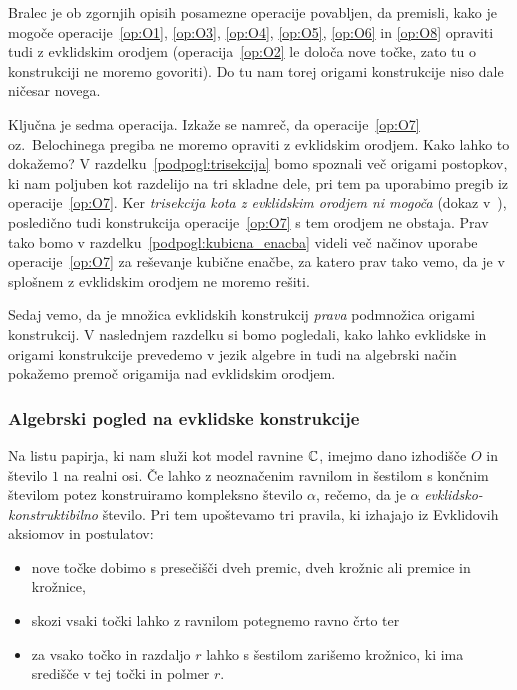 Bralec je ob zgornjih opisih posamezne operacije povabljen, da premisli, kako je mogoče operacije~\ref{op:O1}, \ref{op:O3}, \ref{op:O4}, \ref{op:O5}, \ref{op:O6} in \ref{op:O8} opraviti tudi z evklidskim orodjem (operacija~\ref{op:O2} le določa nove točke, zato tu o konstrukciji ne moremo govoriti). Do tu nam torej origami konstrukcije niso dale ničesar novega.

Ključna je sedma operacija. Izkaže se namreč, da operacije~\ref{op:O7} oz.\ Belochinega pregiba ne moremo opraviti z evklidskim orodjem. Kako lahko to dokažemo? V razdelku~\ref{podpogl:trisekcija} bomo spoznali več origami postopkov, ki nam poljuben kot razdelijo na tri skladne dele, pri tem pa uporabimo pregib iz operacije~\ref{op:O7}. Ker \emph{trisekcija kota z evklidskim orodjem ni mogoča} (dokaz v~\cite[str.\ 77--78]{jerman1998}), posledično tudi konstrukcija operacije~\ref{op:O7} s tem orodjem ne obstaja. Prav tako bomo v razdelku~\ref{podpogl:kubicna_enacba} videli več načinov uporabe operacije~\ref{op:O7} za reševanje kubične enačbe, za katero prav tako vemo, da je v splošnem z evklidskim orodjem ne moremo rešiti.

Sedaj vemo, da je množica evklidskih konstrukcij \emph{prava} podmnožica origami konstrukcij. V naslednjem razdelku si bomo pogledali, kako lahko evklidske in origami konstrukcije prevedemo v jezik algebre in tudi na algebrski način pokažemo premoč origamija nad evklidskim orodjem.

\subsubsection{Algebrski pogled na evklidske konstrukcije}
\label{podpogl:evkl_konstruktibilnost}

\begin{definicija}
    Na listu papirja, ki nam služi kot model ravnine $\mathbb C$, imejmo dano izhodišče $O$ in število $1$ na realni osi. Če lahko z neoznačenim ravnilom in šestilom s končnim številom potez konstruiramo kompleksno število $\alpha$, rečemo, da je $\alpha$ \emph{evklidsko-konstruktibilno} število. Pri tem upoštevamo tri pravila, ki izhajajo iz Evklidovih aksiomov in postulatov:
    \begin{itemize}
        \item nove točke dobimo s presečišči dveh premic, dveh krožnic ali premice in krožnice,
        \item skozi vsaki točki lahko z ravnilom potegnemo ravno črto ter
        \item za vsako točko in razdaljo $r$ lahko s šestilom zarišemo krožnico, ki ima središče v tej točki in polmer $r$.
    \end{itemize}
\end{definicija}

